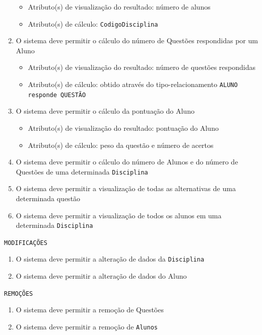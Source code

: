 \documentclass[12pt,a4paper]{article}
\begin{document}
\begin{enumerate}
        \begin{itemize}
            \item Atributo(s) de visualização do resultado: número de alunos
            \item Atributo(s) de cálculo: \texttt{CodigoDisciplina}
        \end{itemize}
    \item O sistema deve permitir o cálculo do número de Questões respondidas por um Aluno
        \begin{itemize}
            \item Atributo(s) de visualização do resultado: número de questões respondidas
            \item Atributo(s) de cálculo: obtido através do tipo-relacionamento \texttt{ALUNO responde QUESTÃO}
        \end{itemize}
    \item O sistema deve permitir o cálculo da pontuação do Aluno
        \begin{itemize}
            \item Atributo(s) de visualização do resultado: pontuação do Aluno
            \item Atributo(s) de cálculo: peso da questão e número de acertos
        \end{itemize}
    \item O sistema deve permitir o cálculo do número de Alunos e do número de Questões de uma determinada \texttt{Disciplina}
    \item O sistema deve permitir a visualização de todas as alternativas de uma determinada questão
    \item O sistema deve permitir a visualização de todos os alunos em uma determinada \texttt{Disciplina}
\end{enumerate}


\vspace{0.5cm}
\begin{center}
    \texttt{MODIFICAÇÕES}
\end{center}
\begin{enumerate}
    \item O sistema deve permitir a alteração de dados da \texttt{Disciplina}
    \item O sistema deve permitir a alteração de dados do Aluno
\end{enumerate}

\vspace{0.5cm}
\begin{center}
    \texttt{REMOÇÕES}
\end{center}
\begin{enumerate}
    \item O sistema deve permitir a remoção de Questões
    \item O sistema deve permitir a remoção de \texttt{Alunos}
\end{enumerate}
\end{document}
